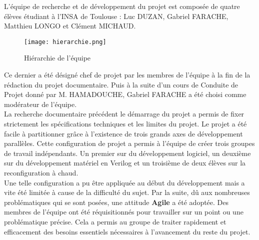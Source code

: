 L'équipe de recherche et de développement du projet est composée de quatre élèves étudiant à l'INSA de Toulouse : Luc DUZAN, Gabriel FARACHE, Matthieu LONGO et Clément MICHAUD.

\begin{figure}[h!]
\centering
\texttt{[image: hierarchie.png]}
\caption{Hiérarchie de l'équipe}
\label{hierarchie-equipe}
\end{figure}

Ce dernier a été désigné chef de projet par les membres de l'équipe à la fin de la rédaction du projet documentaire. Puis à la suite d'un cours de Conduite de Projet donné par M. HAMADOUCHE, Gabriel FARACHE a été choisi comme modérateur de l'équipe.\\
La recherche documentaire précédent le démarrage du projet a permis de fixer strictement les spécifications techniques et les limites du projet. Le projet a été facile à partitionner grâce à l'existence de trois grands axes de développement parallèles. Cette configuration de projet a permis à l'équipe de créer trois groupes de travail indépendants. Un premier sur du développement logiciel, un deuxième sur du développement matériel en Verilog et un troisième de deux élèves sur la reconfiguration à chaud.\\
Une telle configuration a pu être appliquée au début du développement mais a vite été limitée à cause de la difficulté du sujet. Par la suite, dû aux nombreuses problématiques qui se sont posées, une attitude \textbf{Agile} a été adoptée. Des membres de l'équipe ont été réquisitionnés pour travailler sur un point ou une problématique précise. Cela a permis au groupe de traiter rapidement et efficacement des besoins essentiels nécessaires à l'avancement du reste du projet.